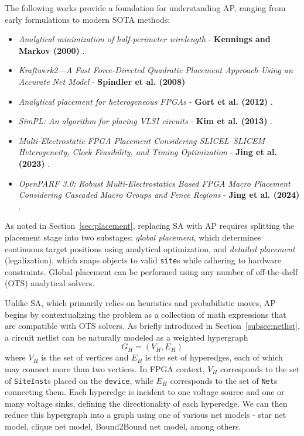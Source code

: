 The following works provide a foundation for understanding AP, ranging from early formulations to modern SOTA methods:
\begin{itemize}
    \item \emph{Analytical minimization of half-perimeter wirelength} - \textbf{Kennings and Markov (2000)} \cite{AP_2000}.
    \item \emph{Kraftwerk2—A Fast Force-Directed Quadratic Placement Approach Using an Accurate Net Model} - \textbf{Spindler et al. (2008)} \cite{kraftwerk2}
    \item \emph{Analytical placement for heterogeneous FPGAs} - \textbf{Gort et al. (2012)} \cite{AP_2012}.
    \item \emph{SimPL: An algorithm for placing VLSI circuits} - \textbf{Kim et al. (2013)} \cite{SimPL}.
    \item \emph{Multi-Electrostatic FPGA Placement Considering SLICEL–SLICEM Heterogeneity, Clock Feasibility, and Timing Optimization} - \textbf{Jing et al. (2023)} \cite{MultiElectrostatic}.
    \item \emph{OpenPARF 3.0: Robust Multi-Electrostatics Based FPGA Macro Placement Considering Cascaded Macro Groups and Fence Regions} - \textbf{Jing et al. (2024)} \cite{OpenPARF}.
\end{itemize}

As noted in Section~\ref{sec:placement}, replacing SA with AP requires splitting the placement stage into two substages:  
\emph{global placement}, which determines continuous target positions using analytical optimization, and  
\emph{detailed placement} (legalization), which snaps objects to valid \texttt{site}s while adhering to hardware constraints.  
Global placement can be performed using any number of off-the-shelf (OTS) analytical solvers.

Unlike SA, which primarily relies on heuristics and probabilistic moves, AP begins by contextualizing the problem as a collection of math expressions that are compatible with OTS solvers.
As briefly introduced in Section~\ref{subsec:netlist}, a circuit netlist can be naturally modeled as a weighted hypergraph
\begin{equation}
    G_{H} = (V_{H}, E_{H})
    \label{equ:hypergraph}
\end{equation}
where \(V_{H}\) is the set of vertices and \(E_{H}\) is the set of hyperedges, each of which may connect more than two vertices. 
In FPGA context, \(V_{H}\) corresponds to the set of \texttt{SiteInst}s placed on the \texttt{device}, while \(E_{H}\) corresponds to the set of \texttt{Net}s connecting them.
Each hyperedge is incident to one voltage source and one or many voltage sinks, defining the directionality of each hyperedge.
We can then reduce this hypergraph into a graph using one of various net models - star net model, clique net model, Bound2Bound net model, among others.

